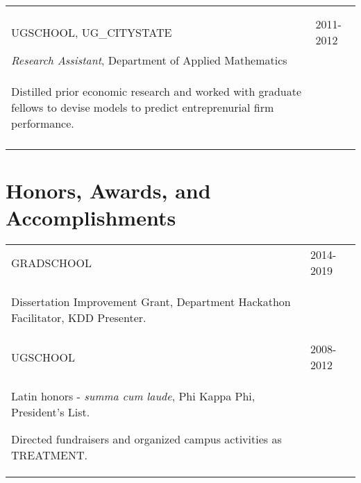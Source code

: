 \documentclass[a4paper,10pt]{article}
\begin{document}
\begin{supertabular}{p{13.9cm}>{\raggedleft\arraybackslash}p{3.4cm}}
\begin{enumerate*}[label =$\circ$, itemjoin={\newline}]
	\end{enumerate*} & \\
	 \\
	


	\textsc{UGSCHOOL}, UG_CITYSTATE
	& \textsc{2011-2012} \\
	\small	\emph{Research Assistant}, Department of Applied Mathematics & \\
	\begin{enumerate*}[label =$\circ$, itemjoin={\newline}]
		\item \footnotesize Distilled prior economic research and worked with graduate fellows to devise models to predict entreprenurial firm performance. 
	\end{enumerate*} & \\
	 \\


\end{supertabular}







\section{Honors, Awards, and Accomplishments}
\begin{supertabular}{p{13.9cm}>{\raggedleft\arraybackslash}p{3.4cm}}

	\textsc{GRADSCHOOL} 
	& \textsc{2014-2019} \\
	\begin{enumerate*}[label =$\circ$, itemjoin={\newline}]
		\item \footnotesize Dissertation Improvement Grant, Department Hackathon Facilitator, KDD Presenter.
	\end{enumerate*} \vspace{2mm} & \\

	\textsc{UGSCHOOL} 
	& \textsc{2008-2012} \\
	\begin{enumerate*}[label =$\circ$, itemjoin={\newline}]
		\item \footnotesize  Latin honors - \emph{summa cum laude}, Phi Kappa Phi, President's List.
		\item \footnotesize  Directed fundraisers and organized campus activities as TREATMENT.
	\end{enumerate*} \vspace{0mm} & \\



\end{supertabular}
\end{document}
